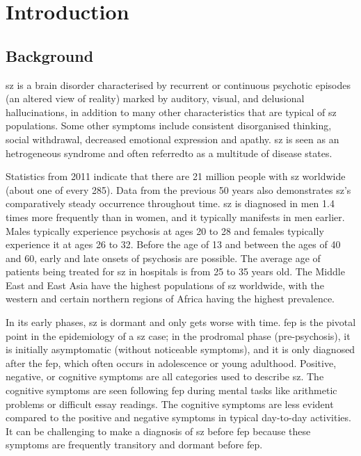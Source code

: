 \chapter{Introduction}\label{Ch:1}		%

\section{Background}\label{sec:Intro}	
\ac{sz} is a brain disorder characterised by recurrent or continuous psychotic episodes (an altered view of reality) marked by 
auditory, visual, and delusional hallucinations, in addition to many other characteristics that are typical of \ac{sz} populations. 
Some other symptoms include consistent disorganised thinking, social withdrawal, decreased emotional expression and apathy. \ac{sz} is 
seen as an hetrogeneous syndrome and often referredto as a multitude of disease states\cite{bakhshi2015neuropathology}.

Statistics from 2011 indicate that there are 21 million people with \ac{sz} worldwide (about one of every 285). Data from the 
previous 50 years also demonstrates \ac{sz}'s comparatively steady occurrence throughout time. \ac{sz} is diagnosed in men 
1.4 times more frequently than in women, and it typically manifests in men earlier. Males typically experience psychosis at ages 20 to 
28 and females typically experience it at ages 26 to 32. Before the age of 13 and between the ages of 40 and 60, early and late onsets 
of psychosis are possible. The average age of patients being treated for \ac{sz} in hospitals is from 25 to 35 years old. The 
Middle East and East Asia have the highest populations of \ac{sz} worldwide, with the western and certain northern regions of 
Africa having the highest prevalence.

In its early phases, \ac{sz} is dormant and only gets worse with time. \ac{fep} is the pivotal point in the 
epidemiology of a \ac{sz} case; in the prodromal phase (pre-psychosis), it is initially asymptomatic (without noticeable symptoms), 
and it is only diagnosed after the \ac{fep}, which often occurs in adolescence or young adulthood. Positive, negative, or cognitive symptoms 
are all categories used to describe \ac{sz}. The cognitive symptoms are seen following \ac{fep} during mental tasks like arithmetic 
problems or difficult essay readings. The cognitive symptoms are less evident compared to the positive and negative symptoms in typical 
day-to-day activities. It can be challenging to make a diagnosis of \ac{sz} before \ac{fep} because these symptoms are frequently 
transitory and dormant before \ac{fep}.

